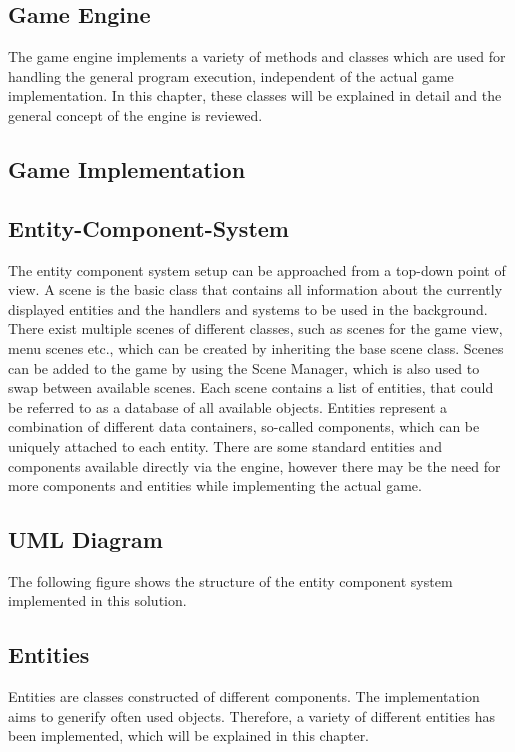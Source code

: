 \subsection{Game Engine}\label{subsec:game}
The game engine implements a variety of methods and classes which are used for handling the general program execution, independent of the actual game implementation.
In this chapter, these classes will be explained in detail and the general concept of the engine is reviewed.

\subsection{Game Implementation}\label{subsec:game-implementation}

\subsection{Entity-Component-System}\label{subsec:entity-component-system}
The entity component system setup can be approached from a top-down point of view.
A scene is the basic class that contains all information about the currently displayed entities and the handlers and systems to be used
in the background.
There exist multiple scenes of different classes, such as scenes for the game view, menu scenes etc., which can be created by
inheriting the base scene class.
Scenes can be added to the game by using the Scene Manager, which is also used to swap between available scenes.
Each scene contains a list of entities, that could be referred to as a database of all available objects.
Entities represent a combination of different data containers, so-called components, which can be uniquely attached to each entity.
There are some standard entities and components available directly via the engine, however there may be the need for more components and entities while implementing the actual game.

\subsection{UML Diagram}\label{subsec:uml-diagram}
The following figure shows the structure of the entity component system implemented in this solution.

\subsection{Entities}\label{subsec:entities}
Entities are classes constructed of different components.
The implementation aims to generify often used objects.
Therefore, a variety of different entities has been implemented, which will be explained in this chapter.

